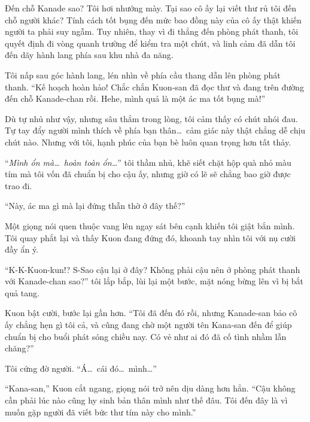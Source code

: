\documentclass[../main.tex]{subfiles}
\begin{document}

Đến chỗ Kanade sao? Tôi hơi nhướng mày. Tại sao cô ấy lại viết thư rủ tôi đến chỗ người khác? Tính cách tốt bụng đến mức bao đồng này của cô ấy thật khiến người ta phải suy ngẫm. Tuy nhiên, thay vì đi thẳng đến phòng phát thanh, tôi quyết định đi vòng quanh trường để kiểm tra một chút, và linh cảm đã dẫn tôi đến dãy hành lang phía sau khu nhà đa năng.

\ct


Tôi nấp sau góc hành lang, lén nhìn về phía cầu thang dẫn lên phòng phát thanh. ``Kế hoạch hoàn hảo! Chắc chắn Kuon-san đã đọc thư và đang trên đường đến chỗ Kanade-chan rồi. Hehe, mình quả là một ác ma tốt bụng mà!''

Dù tự nhủ như vậy, nhưng sâu thẳm trong lòng, tôi cảm thấy có chút nhói đau. Tự tay đẩy người mình thích về phía bạn thân\dots\ cảm giác này thật chẳng dễ chịu chút nào. Nhưng với tôi, hạnh phúc của bạn bè luôn quan trọng hơn tất thảy.

``\textit{Mình ổn mà\dots\ hoàn toàn ổn\dots}'' tôi thầm nhủ, khẽ siết chặt hộp quà nhỏ màu tím mà tôi vốn đã chuẩn bị cho cậu ấy, nhưng giờ có lẽ sẽ chẳng bao giờ được trao đi.

``Này, ác ma gì mà lại đứng thẫn thờ ở đây thế?''

Một giọng nói quen thuộc vang lên ngay sát bên cạnh khiến tôi giật bắn mình. Tôi quay phắt lại và thấy Kuon đang đứng đó, khoanh tay nhìn tôi với nụ cười đầy ẩn ý.

``K-K-Kuon-kun!? S-Sao cậu lại ở đây? Không phải cậu nên ở phòng phát thanh với Kanade-chan sao?'' tôi lắp bắp, lùi lại một bước, mặt nóng bừng lên vì bị bắt quả tang.

Kuon bật cười, bước lại gần hơn. ``Tôi đã đến đó rồi, nhưng Kanade-san bảo cô ấy chẳng hẹn gì tôi cả, và cũng đang chờ một người tên Kana-san đến để giúp chuẩn bị cho buổi phát sóng chiều nay. Có vẻ như ai đó đã cố tình nhầm lẫn chăng?''

Tôi cứng đờ người. ``Á\dots\ cái đó\dots\ mình\dots''

``Kana-san,'' Kuon cắt ngang, giọng nói trở nên dịu dàng hơn hẳn. ``Cậu không cần phải lúc nào cũng hy sinh bản thân mình như thế đâu. Tôi đến đây là vì muốn gặp người đã viết bức thư tím này cho mình.''
\end{document}

